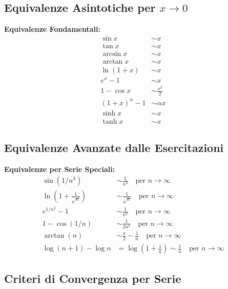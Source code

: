 \subsection{Equivalenze Asintotiche per $x \to 0$}

\begin{info}
\textbf{Equivalenze Fondamentali:}
\begin{align}
\sin x &\sim x \\
\tan x &\sim x \\
\arcsin x &\sim x \\
\arctan x &\sim x \\
\ln(1+x) &\sim x \\
e^x - 1 &\sim x \\
1 - \cos x &\sim \frac{x^2}{2} \\
(1+x)^\alpha - 1 &\sim \alpha x \\
\sinh x &\sim x \\
\tanh x &\sim x
\end{align}
\end{info}

\subsection{Equivalenze Avanzate dalle Esercitazioni}

\begin{info}
\textbf{Equivalenze per Serie Speciali:}
\begin{align}
\sin(1/n^3) &\sim \frac{1}{n^3} \quad \text{per } n \to \infty \\
\ln\left(1 + \frac{1}{\sqrt{n}}\right) &\sim \frac{1}{\sqrt{n}} \quad \text{per } n \to \infty \\
e^{1/n^2} - 1 &\sim \frac{1}{n^2} \quad \text{per } n \to \infty \\
1 - \cos(1/n) &\sim \frac{1}{2n^2} \quad \text{per } n \to \infty \\
\arctan(n) &\sim \frac{\pi}{2} - \frac{1}{n} \quad \text{per } n \to \infty \\
\log(n+1) - \log n &= \log\left(1 + \frac{1}{n}\right) \sim \frac{1}{n} \quad \text{per } n \to \infty
\end{align}
\end{info}

\subsection{Criteri di Convergenza per Serie}

